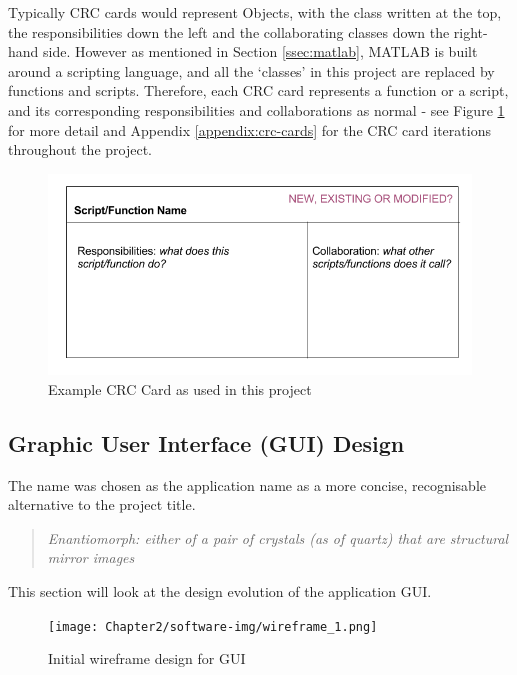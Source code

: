 Typically \acrshort{CRC} cards would represent Objects, with the class written at the top, the responsibilities down the left and the collaborating classes down the right-hand side. However as mentioned in Section \ref{ssec:matlab}, MATLAB is built around a scripting language, and all the `classes' in this project are replaced by functions and scripts. Therefore, each \acrshort{CRC} card represents a function or a script, and its corresponding responsibilities and collaborations as normal - see Figure \ref{fig:crc} for more detail and Appendix \ref{appendix:crc-cards} for the \acrshort{CRC} card iterations throughout the project.

\begin{figure}[H]
  \center
  \includegraphics[scale=0.5]{Chapter2/software-img/crc.png}
  \caption{Example CRC Card as used in this project}
  \label{fig:crc}
\end{figure}

\subsection{Graphic User Interface (GUI) Design}
\label{sssec:gui-design}

The name  was chosen as the application name as a more concise, recognisable alternative to the project title.

\begin{quotation}
  \textit{Enantiomorph: either of a pair of crystals (as of quartz) that are structural mirror images \cite{enantiomorph}}
\end{quotation}

This section will look at the design evolution of the application \acrfull{GUI}.

\begin{figure}[H]
  \center
  \texttt{[image: Chapter2/software-img/wireframe\_1.png]}
  \caption{Initial wireframe design for \acrshort{GUI}}
  \label{fig:wireframe1}
\end{figure}

